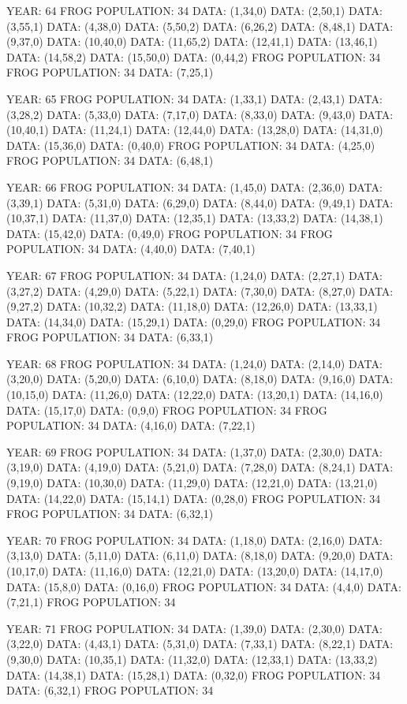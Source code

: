 \documentclass[12pt,a4paper]{article}
\begin{document}
{YEAR: 64
FROG POPULATION: 34
DATA: (1,34,0)
DATA: (2,50,1)
DATA: (3,55,1)
DATA: (4,38,0)
DATA: (5,50,2)
DATA: (6,26,2)
DATA: (8,48,1)
DATA: (9,37,0)
DATA: (10,40,0)
DATA: (11,65,2)
DATA: (12,41,1)
DATA: (13,46,1)
DATA: (14,58,2)
DATA: (15,50,0)
DATA: (0,44,2)
FROG POPULATION: 34
FROG POPULATION: 34
DATA: (7,25,1)

YEAR: 65
FROG POPULATION: 34
DATA: (1,33,1)
DATA: (2,43,1)
DATA: (3,28,2)
DATA: (5,33,0)
DATA: (7,17,0)
DATA: (8,33,0)
DATA: (9,43,0)
DATA: (10,40,1)
DATA: (11,24,1)
DATA: (12,44,0)
DATA: (13,28,0)
DATA: (14,31,0)
DATA: (15,36,0)
DATA: (0,40,0)
FROG POPULATION: 34
DATA: (4,25,0)
FROG POPULATION: 34
DATA: (6,48,1)

YEAR: 66
FROG POPULATION: 34
DATA: (1,45,0)
DATA: (2,36,0)
DATA: (3,39,1)
DATA: (5,31,0)
DATA: (6,29,0)
DATA: (8,44,0)
DATA: (9,49,1)
DATA: (10,37,1)
DATA: (11,37,0)
DATA: (12,35,1)
DATA: (13,33,2)
DATA: (14,38,1)
DATA: (15,42,0)
DATA: (0,49,0)
FROG POPULATION: 34
FROG POPULATION: 34
DATA: (4,40,0)
DATA: (7,40,1)

YEAR: 67
FROG POPULATION: 34
DATA: (1,24,0)
DATA: (2,27,1)
DATA: (3,27,2)
DATA: (4,29,0)
DATA: (5,22,1)
DATA: (7,30,0)
DATA: (8,27,0)
DATA: (9,27,2)
DATA: (10,32,2)
DATA: (11,18,0)
DATA: (12,26,0)
DATA: (13,33,1)
DATA: (14,34,0)
DATA: (15,29,1)
DATA: (0,29,0)
FROG POPULATION: 34
FROG POPULATION: 34
DATA: (6,33,1)

YEAR: 68
FROG POPULATION: 34
DATA: (1,24,0)
DATA: (2,14,0)
DATA: (3,20,0)
DATA: (5,20,0)
DATA: (6,10,0)
DATA: (8,18,0)
DATA: (9,16,0)
DATA: (10,15,0)
DATA: (11,26,0)
DATA: (12,22,0)
DATA: (13,20,1)
DATA: (14,16,0)
DATA: (15,17,0)
DATA: (0,9,0)
FROG POPULATION: 34
FROG POPULATION: 34
DATA: (4,16,0)
DATA: (7,22,1)

YEAR: 69
FROG POPULATION: 34
DATA: (1,37,0)
DATA: (2,30,0)
DATA: (3,19,0)
DATA: (4,19,0)
DATA: (5,21,0)
DATA: (7,28,0)
DATA: (8,24,1)
DATA: (9,19,0)
DATA: (10,30,0)
DATA: (11,29,0)
DATA: (12,21,0)
DATA: (13,21,0)
DATA: (14,22,0)
DATA: (15,14,1)
DATA: (0,28,0)
FROG POPULATION: 34
FROG POPULATION: 34
DATA: (6,32,1)

YEAR: 70
FROG POPULATION: 34
DATA: (1,18,0)
DATA: (2,16,0)
DATA: (3,13,0)
DATA: (5,11,0)
DATA: (6,11,0)
DATA: (8,18,0)
DATA: (9,20,0)
DATA: (10,17,0)
DATA: (11,16,0)
DATA: (12,21,0)
DATA: (13,20,0)
DATA: (14,17,0)
DATA: (15,8,0)
DATA: (0,16,0)
FROG POPULATION: 34
DATA: (4,4,0)
DATA: (7,21,1)
FROG POPULATION: 34

YEAR: 71
FROG POPULATION: 34
DATA: (1,39,0)
DATA: (2,30,0)
DATA: (3,22,0)
DATA: (4,43,1)
DATA: (5,31,0)
DATA: (7,33,1)
DATA: (8,22,1)
DATA: (9,30,0)
DATA: (10,35,1)
DATA: (11,32,0)
DATA: (12,33,1)
DATA: (13,33,2)
DATA: (14,38,1)
DATA: (15,28,1)
DATA: (0,32,0)
FROG POPULATION: 34
DATA: (6,32,1)
FROG POPULATION: 34

}
\end{document}
